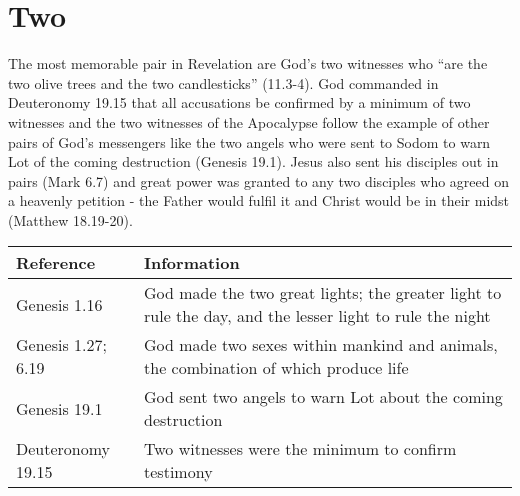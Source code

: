\section*{Two}
The most memorable pair in Revelation are God's two witnesses who ``are the two olive trees and the two candlesticks'' (11.3-4). God commanded in Deuteronomy 19.15 that all accusations be confirmed by a minimum of two witnesses and the two witnesses of the Apocalypse follow the example of other pairs of God's messengers like the two angels who were sent to Sodom to warn Lot of the coming destruction (Genesis 19.1). Jesus also sent his disciples out in pairs (Mark 6.7) and great power was granted to any two disciples who agreed on a heavenly petition - the Father would fulfil it and Christ would be in their midst (Matthew 18.19-20).  
\newline\newline
\begin{tabularx}{\textwidth}{l X}
\toprule
\textbf{Reference} & \textbf{Information}\\
\midrule
Genesis 1.16 & God made the two great lights; the greater light to rule the day, and the lesser light to rule the night \\
\addlinespace
Genesis 1.27; 6.19 & God made two sexes within mankind and animals, the combination of which produce life \\
\addlinespace
Genesis 19.1 & God sent two angels to warn Lot about the coming destruction \\
\addlinespace
Deuteronomy 19.15 & Two witnesses were the minimum to confirm testimony \\
\bottomrule
\end{tabularx}

